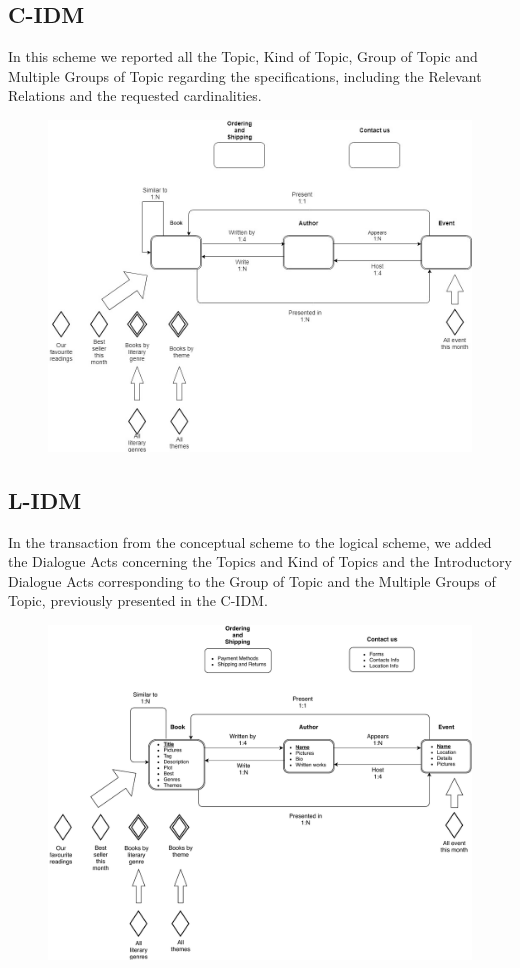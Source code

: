 \documentclass[12pt,a4paper]{article}
\begin{document}
\subsection{C-IDM}
In this scheme we reported all the Topic, Kind of Topic, Group of Topic and Multiple Groups of Topic regarding the specifications, including the Relevant Relations and the requested cardinalities.
\begin{figure}[h!]
\centering
\includegraphics[width=0.9\linewidth]{imm.jpg}
\label{fig:IDM}
\end{figure}

\newpage
\subsection{L-IDM}
In the transaction from the conceptual scheme to the logical scheme, we added the Dialogue Acts concerning the Topics and Kind of Topics and the Introductory Dialogue Acts corresponding to the Group of Topic and the Multiple Groups of Topic, previously presented in the C-IDM.
\begin{figure}[h!]
	\centering
	\includegraphics[width=1.0\linewidth]{L-IDM}
	\label{fig:l-idm}	
\end{figure}
\end{document}
